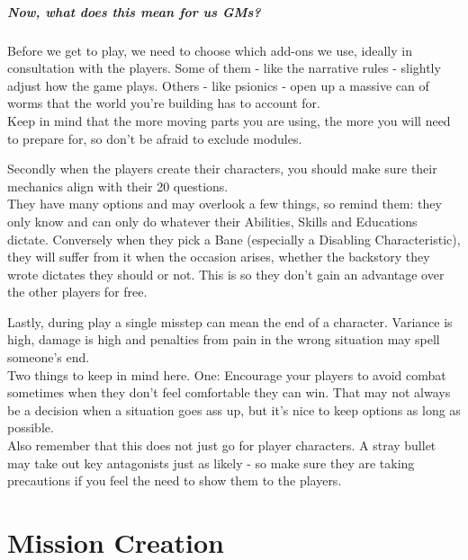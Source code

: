 \documentclass[12pt,a4paper,openany,usenames,dvipsnames]{book}
\begin{document}
	\paragraph{Now, what does this mean for us GMs?}
	\def\hspacepar{5mm}
	\def\vspacepar{-5mm}
	Before we get to play, we need to choose which add-ons we use, ideally in consultation with the players. Some of them - like the narrative rules - slightly adjust how the game plays. Others - like psionics - open up a massive can of worms that the world you're building has to account for.\\
	\hspace*{\hspacepar} Keep in mind that the more moving parts you are using, the more you will need to prepare for, so don't be afraid to exclude modules.\par \vspace{\vspacepar}
	Secondly when the players create their characters, you should make sure their mechanics align with their 20 questions.\\
	\hspace*{\hspacepar} They have many options and may overlook a few things, so remind them: they only know and can only do whatever their Abilities, Skills and Educations dictate.
	Conversely when they pick a Bane (especially a Disabling Characteristic), they will suffer from it when the occasion arises, whether the backstory they wrote dictates they should or not. This is so they don't gain an advantage over the other players for free.
	\par \vspace{\vspacepar}
	Lastly, during play a single misstep can mean the end of a character. Variance is high, damage is high and penalties from pain in the wrong situation may spell someone's end.\\
	\hspace*{\hspacepar} Two things to keep in mind here. One: Encourage your players to avoid combat sometimes when they don't feel comfortable they can win. That may not always be a decision when a situation goes ass up, but it's nice to keep options as long as possible.\\
	\hspace*{\hspacepar} Also remember that this does not just go for player characters. A stray bullet may take out key antagonists just as likely - so make sure they are taking precautions if you feel the need to show them to the players.

	\chapter{Mission Creation}
	
\end{document}

